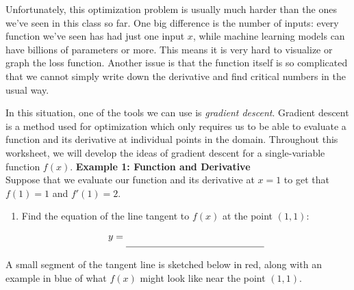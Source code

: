 \documentclass[11pt]{article}
\begin{document}
Unfortunately, this optimization problem is usually much harder than the ones we've seen in this class so far. One big difference is the number of inputs: every function we've seen has had just one input $x$, while machine learning models can have billions of parameters or more. This means it is very hard to visualize or graph the loss function. Another issue is that the function itself is so complicated that we cannot simply write down the derivative and find critical numbers in the usual way.

In this situation, one of the tools we can use is \textit{gradient descent}. Gradient descent is a method used for optimization which only requires us to be able to evaluate a function and its derivative at individual points in the domain. Throughout this worksheet, we will develop the ideas of gradient descent for a single-variable function $f(x)$.
\newpage
{\bf Example 1: Function and Derivative}\\

Suppose that we evaluate our function and its derivative at $x=1$ to get that $f(1) = 1$ and $f'(1) = 2$.

\begin{enumerate}
\item Find the equation of the line tangent to $f(x)$ at the point $(1,1)$:
\[
    y = \unlineb{2}{}
\]
\end{enumerate}

A small segment of the tangent line is sketched below in red, along with an example in blue of what $f(x)$ might look like near the point $(1,1)$.

\begin{center}
\end{center}
\end{document}
